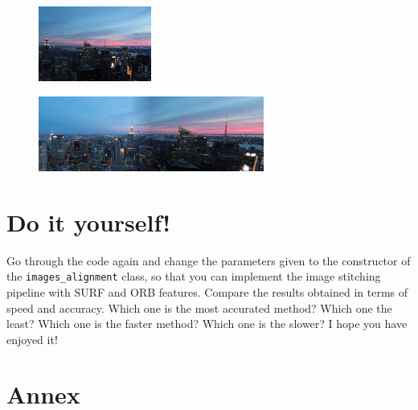 \documentclass[aps,letterpaper,10pt]{revtex4}
\begin{document}
\begin{figure}[h]
	\begin{center}
		\includegraphics[width=0.33\textwidth]{imgs/rockfeller_2.JPG}
	\end{center}
\label{Second view of New York skyline.}
\end{figure}

\begin{figure}[h]
	\begin{center}
		\includegraphics[width=0.66\textwidth]{imgs/panorama.jpg}
	\end{center}
\label{Pair matching of two view of New York skyline.}
\end{figure}

\section{Do it yourself!}
Go through the code again and change the parameters given to the constructor of the \verb|images_alignment| class, so that you can implement the image stitching pipeline with SURF and ORB features. Compare the results obtained in terms of speed and accuracy. \newline
Which one is the most accurated method? Which one the least? Which one is the faster method? Which one is the slower?\newline
\vspace{3mm}
I hope you have enjoyed it!

\newpage
\section{Annex}
\end{document}
